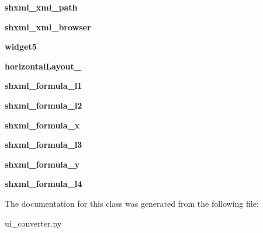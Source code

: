 \begin{DoxyCompactItemize}
\item 
\hypertarget{class_sim_g_d_c_1_1ui__converter_1_1_ui___converter_aadfae6871b5934b165f58d940c14e69f}{}{\bfseries shxml\+\_\+xml\+\_\+path}\label{class_sim_g_d_c_1_1ui__converter_1_1_ui___converter_aadfae6871b5934b165f58d940c14e69f}

\item 
\hypertarget{class_sim_g_d_c_1_1ui__converter_1_1_ui___converter_afa6f8fd44f58be5c17a5c00a5e472364}{}{\bfseries shxml\+\_\+xml\+\_\+browser}\label{class_sim_g_d_c_1_1ui__converter_1_1_ui___converter_afa6f8fd44f58be5c17a5c00a5e472364}

\item 
\hypertarget{class_sim_g_d_c_1_1ui__converter_1_1_ui___converter_af187892a045cc83bf6af0030b0a02977}{}{\bfseries widget5}\label{class_sim_g_d_c_1_1ui__converter_1_1_ui___converter_af187892a045cc83bf6af0030b0a02977}

\item 
\hypertarget{class_sim_g_d_c_1_1ui__converter_1_1_ui___converter_a9d6825f312255fb5a65b979778365f53}{}{\bfseries horizontal\+Layout\+\_}\label{class_sim_g_d_c_1_1ui__converter_1_1_ui___converter_a9d6825f312255fb5a65b979778365f53}

\item 
\hypertarget{class_sim_g_d_c_1_1ui__converter_1_1_ui___converter_a3bcd0bf067bfb3585c7f0ace939cc113}{}{\bfseries shxml\+\_\+formula\+\_\+l1}\label{class_sim_g_d_c_1_1ui__converter_1_1_ui___converter_a3bcd0bf067bfb3585c7f0ace939cc113}

\item 
\hypertarget{class_sim_g_d_c_1_1ui__converter_1_1_ui___converter_a544b3237673dba17e8403620b868ad1a}{}{\bfseries shxml\+\_\+formula\+\_\+l2}\label{class_sim_g_d_c_1_1ui__converter_1_1_ui___converter_a544b3237673dba17e8403620b868ad1a}

\item 
\hypertarget{class_sim_g_d_c_1_1ui__converter_1_1_ui___converter_a86bf1ff5ef0647b65bd4748907aef1da}{}{\bfseries shxml\+\_\+formula\+\_\+x}\label{class_sim_g_d_c_1_1ui__converter_1_1_ui___converter_a86bf1ff5ef0647b65bd4748907aef1da}

\item 
\hypertarget{class_sim_g_d_c_1_1ui__converter_1_1_ui___converter_afbda2d7523e5ef38980f895ccf9c3e25}{}{\bfseries shxml\+\_\+formula\+\_\+l3}\label{class_sim_g_d_c_1_1ui__converter_1_1_ui___converter_afbda2d7523e5ef38980f895ccf9c3e25}

\item 
\hypertarget{class_sim_g_d_c_1_1ui__converter_1_1_ui___converter_a29b5dff3681539fa831ff27721aff9d8}{}{\bfseries shxml\+\_\+formula\+\_\+y}\label{class_sim_g_d_c_1_1ui__converter_1_1_ui___converter_a29b5dff3681539fa831ff27721aff9d8}

\item 
\hypertarget{class_sim_g_d_c_1_1ui__converter_1_1_ui___converter_a05bf0b233c928a72e56f921b890c81c1}{}{\bfseries shxml\+\_\+formula\+\_\+l4}\label{class_sim_g_d_c_1_1ui__converter_1_1_ui___converter_a05bf0b233c928a72e56f921b890c81c1}

\end{DoxyCompactItemize}


The documentation for this class was generated from the following file\+:\begin{DoxyCompactItemize}
\item 
ui\+\_\+converter.\+py\end{DoxyCompactItemize}
